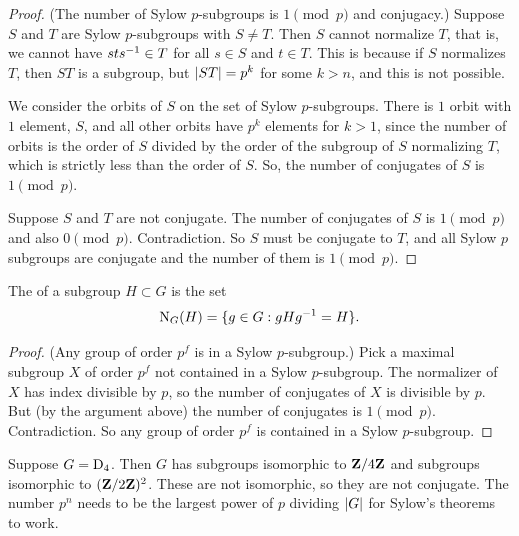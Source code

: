 \documentclass[11pt, oneside]{amsart}
\begin{document}
\begin{proof}
(The number of Sylow $p$-subgroups is $1\pmod p$ and conjugacy.)  Suppose $S$ and $T$ are Sylow $p$-subgroups with $S\neq T$. Then $S$ cannot normalize $T$, that is, we cannot have $sts^{-1} \in T$ for all $s\in S$ and $t\in T$. This is because if $S$ normalizes $T$, then $ST$ is a subgroup, but $\left \lvert ST \right \rvert = p^k$ for some $k>n$, and this is not possible. 

We consider the orbits of $S$ on the set of Sylow $p$-subgroups. There is $1$ orbit with $1$ element, $S$, and all other orbits have $p^k$ elements for $k>1$, since the number of orbits is the order of $S$ divided by the order of the subgroup of $S$ normalizing $T$, which is strictly less than the order of $S$. So, the number of conjugates of $S$ is $1\pmod p$.

Suppose $S$ and $T$ are not conjugate. The number of conjugates of $S$ is $1\pmod p$ and also $0\pmod p$. Contradiction. %
So $S$ must be conjugate to $T$, and all Sylow $p$ subgroups are conjugate and the number of them is $1\pmod p$.
\end{proof}

\begin{definition}
The  of a subgroup $H\subset G$ is the set
$$
\operatorname{N}_G(H) = \{ g\in G : gHg^{-1} = H\}.
$$ 
\end{definition}
\begin{proof}
(Any group of order $p^f$ is in a Sylow $p$-subgroup.) Pick a maximal subgroup $X$ of order $p^f$ not contained in a Sylow $p$-subgroup. The normalizer of $X$ has index divisible by $p$, so the number of conjugates of $X$ is divisible by $p$. But (by the argument above) the number of conjugates is $1\pmod p$. Contradiction. So any group of order $p^f$ is contained in a Sylow $p$-subgroup.
\end{proof}

\begin{example}
Suppose $G = \operatorname{D}_4$. Then $G$ has subgroups isomorphic to $\mathbf Z/4\mathbf Z$ and subgroups isomorphic to $(\mathbf Z/2\mathbf Z)^2$. These are not isomorphic, so they are not conjugate. The number $p^n$ needs to be the largest power of $p$ dividing $\left \lvert G \right \rvert$ for Sylow's theorems to work.
\end{example}
\end{document}
